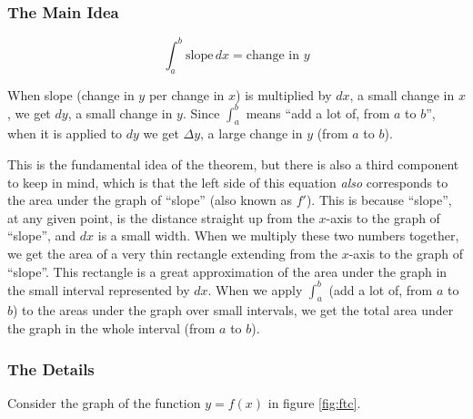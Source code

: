 \documentclass{myarticle}
\theoremstyle{nospace}
\newtheorem{old series theorem}{Theorem}
\newenvironment{series theorem}
{\begin{mdframed}\begin{old series theorem}}
    {\end{old series theorem}\end{mdframed}}
\begin{document}
\subsubsection{The Main Idea}
\label{sec:ftc idea}

\[
  \int_a^b \text{slope} \,dx = \text{change in $y$}
\]

When slope (change in $y$ per change in $x$) is multiplied by $dx$, a
small change in $x$, we get $dy$, a small change in $y$. Since
$\int_a^b$ means ``add a lot of, from $a$ to $b$'', when it is applied
to $dy$ we get $\Delta y$, a large change in $y$ (from $a$ to $b$).

This is the fundamental idea of the theorem, but there is also a third
component to keep in mind, which is that the left side of this
equation \emph{also} corresponds to the area under the graph of
``slope'' (also known as $f'$). This is because ``slope'', at any
given point, is the distance straight up from the $x$-axis to the
graph of ``slope'', and $dx$ is a small width. When we multiply these
two numbers together, we get the area of a very thin rectangle
extending from the $x$-axis to the graph of ``slope''. This rectangle
is a great approximation of the area under the graph in the small
interval represented by $dx$. When we apply $\int_a^b$ (add a lot of,
from $a$ to $b$) to the areas under the graph over small intervals, we
get the total area under the graph in the whole interval (from $a$ to
$b$).

\subsubsection{The Details}
\label{sec:ftc details}

Consider the graph of the function $y = f(x)$ in figure \ref{fig:ftc}.
\end{document}
